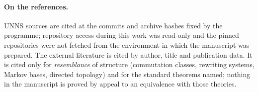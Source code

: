 \paragraph{On the references.} UNNS sources are cited at the commits and archive hashes fixed by the programme; repository access during this work was read-only and the pinned repositories were not fetched from the environment in which the manuscript was prepared. The external literature is cited by author, title and publication data. It is cited only for \emph{resemblance} of structure (commutation classes, rewriting systems, Markov bases, directed topology) and for the standard theorems named; nothing in the manuscript is proved by appeal to an equivalence with those theories.
